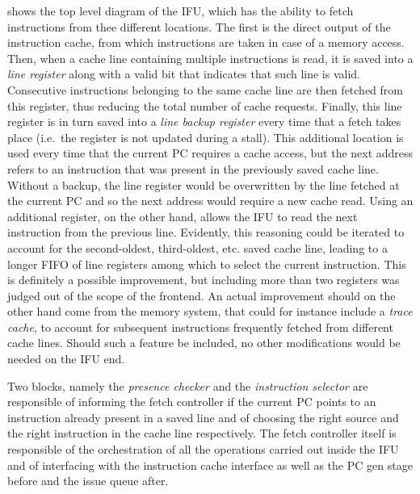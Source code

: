  shows the top level diagram of the \ac{IFU}, which has the ability to fetch instructions from thee different locations. The first is the direct output of the instruction cache, from which instructions are taken in case of a memory access. Then, when a cache line containing multiple instructions is read, it is saved into a \emph{line register} along with a valid bit that indicates that such line is valid. Consecutive instructions belonging to the same cache line are then fetched from this register, thus reducing the total number of cache requests. Finally, this line register is in turn saved into a \emph{line backup register} every time that a fetch takes place (i.e.\ the register is not updated during a stall). This additional location is used every time that the current \ac{PC} requires a cache access, but the next address refers to an instruction that was present in the previously saved cache line. Without a backup, the line register would be overwritten by the line fetched at the current \ac{PC} and so the next address would require a new cache read. Using an additional register, on the other hand, allows the \ac{IFU} to read the next instruction from the previous line. Evidently, this reasoning could be iterated to account for the second-oldest, third-oldest, etc. saved cache line, leading to a longer \acs{FIFO} of line registers among which to select the current instruction. This is definitely a possible improvement, but including more than two registers was judged out of the scope of the frontend. An actual improvement should on the other hand come from the memory system, that could for instance include a \emph{trace cache}, to account for subsequent instructions frequently fetched from different cache lines. Should such a feature be included, no other modifications would be needed on the \ac{IFU} end.

Two blocks, namely the \emph{presence checker} and the \emph{instruction selector} are responsible of informing the fetch controller if the current \ac{PC} points to an instruction already present in a saved line and of choosing the right source and the right instruction in the cache line respectively. The fetch controller itself is responsible of the orchestration of all the operations carried out inside the \ac{IFU} and of interfacing with the instruction cache interface as well as the \ac{PC} gen stage before and the issue queue after.

